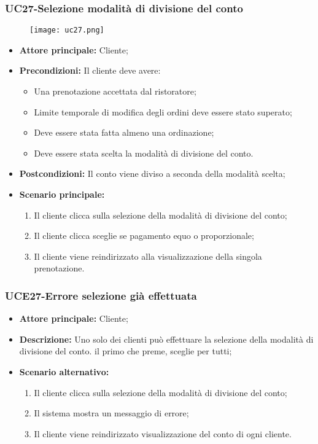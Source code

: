 \nonstopmode

\subsubsection{UC27-Selezione modalità di divisione del conto}
\begin{figure}[h] \texttt{[image: uc27.png]} \end{figure}
\begin{itemize}
\item \textbf{Attore principale:} Cliente;
\item \textbf{Precondizioni:} Il cliente deve avere:
  \begin{itemize}
    \item Una prenotazione accettata dal ristoratore;
    \item Limite temporale di modifica degli ordini deve essere stato superato;
    \item Deve essere stata fatta almeno una ordinazione;
    \item Deve essere stata scelta la modalità di divisione del conto.
  \end{itemize}
\item \textbf{Postcondizioni:} Il conto viene diviso a seconda della modalità scelta;
\item \textbf{Scenario principale:}
\begin{enumerate}
    \item Il cliente clicca sulla selezione della modalità di divisione del conto;
    \item Il cliente clicca sceglie se pagamento equo o proporzionale;
    \item Il cliente viene reindirizzato alla visualizzazione della singola prenotazione.
\end{enumerate}
\end{itemize}

\subsubsection{UCE27-Errore selezione già effettuata}
\begin{itemize}
\item \textbf{Attore principale:} Cliente;
\item \textbf{Descrizione:} Uno solo dei clienti può effettuare la selezione della modalità di divisione del conto. il primo che preme, sceglie per tutti;
\item \textbf{Scenario alternativo:}
\begin{enumerate}
    \item Il cliente clicca sulla selezione della modalità di divisione del conto;
    \item Il sistema mostra un messaggio di errore;
    \item Il cliente viene reindirizzato visualizzazione del conto di ogni cliente.
\end{enumerate}
\end{itemize}

